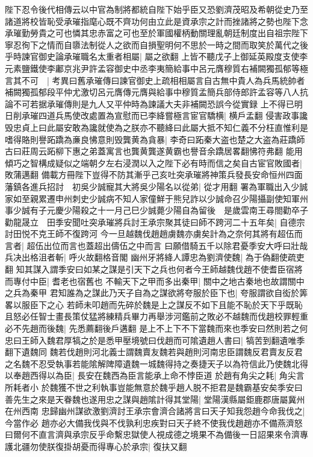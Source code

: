 陛下忍令後代相傳云以中官為制將都統自陛下始乎臣又恐劉濟茂昭及希朝從史乃至諸道將校皆恥受承璀指麾心既不齊功何由立此是資承宗之計而挫諸將之勢也陛下念承璀勤勞貴之可也憐其忠赤富之可也至於軍國權柄動關理亂朝廷制度出自祖宗陛下寧忍徇下之情而自隳法制從人之欲而自損聖明何不思於一時之間而取笑於萬代之後乎時諫官御史論承璀職名太重者相屬|{
	屬之欲翻}
上皆不聽戊子上御延英殿度支使李元素鹽鐵使李鄘京兆尹許孟容御史中丞李夷簡給事中呂元膺穆質右補闕獨孤郁等極言其不可　|{
	考異曰舊承璀傳曰諫官御史上疏相相屬言自古無中貴人為兵馬統帥者補闕獨孤郁段平仲尤激切呂元膺傳元膺與給事中穆質孟簡兵部侍郎許孟容等八人抗論不可若据承璀傳則是九人又平仲時為諫議大夫非補闕恐誤今從實録}
上不得已明日削承璀四道兵馬使改處置為宣慰而已李絳嘗極言宦官驕横|{
	横戶孟翻}
侵害政事讒毁忠貞上曰此屬安敢為讒就使為之朕亦不聽絳曰此屬大抵不知仁義不分枉直惟利是嗜得賂則譽跖蹻為亷良怫意則毁龔黄為貪暴|{
	李奇曰跖秦大盗也楚之大盗為莊蹻師古曰莊周云跖柳下惠之弟蓋寓言也龔黄龔遂黄霸也譽音余蹻居畧翻怫符弗翻}
能用傾巧之智構成疑似之端朝夕左右浸潤以入之陛下必有時而信之矣自古宦官敗國者|{
	敗蒲邁翻}
備載方冊陛下豈得不防其漸乎己亥吐突承璀將神策兵發長安命恒州四面藩鎮各進兵招討　初吳少誠寵其大將吳少陽名以從弟|{
	從才用翻}
署為軍職出入少誠家如至親累遷申州刺史少誠病不知人家僮鮮于熊兒詐以少誠命召少陽攝副使知軍州事少誠有子元慶少陽殺之十一月己巳少誠薨少陽自為留後　是歲雲南王尋閤勸卒子勸龍晟立　田季安聞吐突承璀將兵討王承宗聚其徒曰師不跨河二十五年矣|{
	自德宗討田悦不克王師不復跨河}
今一旦越魏伐趙趙虜魏亦虜矣計為之奈何其將有超伍而言者|{
	超伍出位而言也蓋超出儔伍之中而言}
曰願借騎五千以除君憂季安大呼曰壯哉兵决出格沮者斬|{
	呼火故翻格音閣}
幽州牙將絳人譚忠為劉濟使魏|{
	為于偽翻使疏吏翻}
知其謀入謂季安曰如某之謀是引天下之兵也何者今王師越魏伐趙不使耆臣宿將而專付中臣|{
	耆老也宿舊也}
不輸天下之甲而多出秦甲|{
	關中之地古秦地也故謂關中之兵為秦甲}
君知誰為之謀此乃天子自為之謀欲將夸服於臣下也|{
	夸服謂欲自衒於筭畧以服臣下之心}
若師未叩趙而先碎於魏是上之謀反不如下且能不恥於天下乎既恥且怒必任智士畫長策仗猛將練精兵畢力再舉涉河鑑前之敗必不越魏而伐趙校罪輕重必不先趙而後魏|{
	先悉薦翻後戶遘翻}
是上不上下不下當魏而來也季安曰然則若之何忠曰王師入魏君厚犒之於是悉甲壓境號曰伐趙而可隂遺趙人書曰|{
	犒苦到翻遺唯季翻下遺魏同}
魏若伐趙則河北義士謂魏賣友魏若與趙則河南忠臣謂魏反君賣友反君之名魏不忍受執事若能隂解陴障遺魏一城魏得持之奏捷天子以為符信此乃使魏北得以奉趙西得以為臣|{
	長安在魏西為臣言能承上命不悖臣道}
於趙有角尖之耗|{
	角尖言所耗者小}
於魏獲不世之利執事豈能無意於魏乎趙人脱不拒君是魏霸基安矣季安曰善先生之來是天眷魏也遂用忠之謀與趙隂計得其堂陽|{
	堂陽漢縣屬鉅鹿郡唐屬冀州在州西南}
忠歸幽州謀欲激劉濟討王承宗會濟合諸將言曰天子知我怨趙今命我伐之|{
	今當作必}
趙亦必大備我伐與不伐孰利忠疾對曰天子終不使我伐趙趙亦不備燕濟怒曰爾何不直言濟與承宗反乎命繫忠獄使人視成德之境果不為備後一日詔果來令濟專護北疆勿使朕復掛胡憂而得專心於承宗|{
	復扶又翻}
